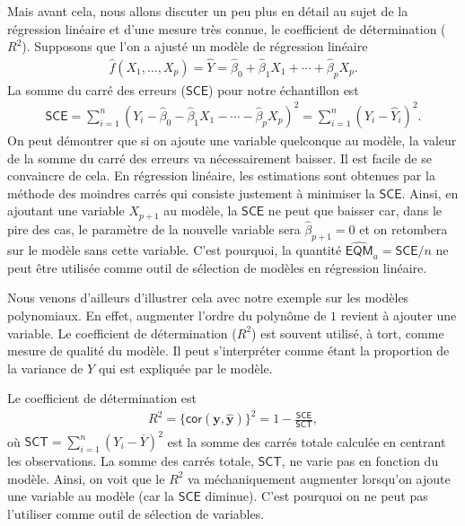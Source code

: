 \documentclass[
  11pt,
  letterpaper,
]{book}
\theoremstyle{definition}
\theoremstyle{remark}
\begin{document}
Mais avant cela, nous allons discuter un peu plus en détail au sujet de
la régression linéaire et d'une mesure très connue, le coefficient de
détermination (\(R^2\)). Supposons que l'on a ajusté un modèle de
régression linéaire \begin{align*}
\widehat{f}(X_1, \ldots, X_p) = \widehat{Y}=\widehat{\beta}_0 + \widehat{\beta}_1X_1+ \cdots + \widehat{\beta}_p X_p.
\end{align*} La somme du carré des erreurs (\(\mathsf{SCE}\)) pour notre
échantillon est \begin{align*}
\mathsf{SCE}=\sum_{i=1}^n (Y_i - \widehat{\beta}_0 - \widehat{\beta}_1X_1 - \cdots - \widehat{\beta}_p X_p)^2 = \sum_{i=1}^n (Y_i-\widehat{Y}_i)^2.
 \end{align*} On peut démontrer que si on ajoute une variable quelconque
au modèle, la valeur de la somme du carré des erreurs va nécessairement
baisser. Il est facile de se convaincre de cela. En régression linéaire,
les estimations sont obtenues par la méthode des moindres carrés qui
consiste justement à minimiser la \(\mathsf{SCE}\). Ainsi, en ajoutant
une variable \(X_{p+1}\) au modèle, la \(\mathsf{SCE}\) ne peut que
baisser car, dans le pire des cas, le paramètre de la nouvelle variable
sera \(\widehat{\beta}_{p+1}=0\) et on retombera sur le modèle sans
cette variable. C'est pourquoi, la quantité
\(\widehat{\mathsf{EQM}}_a=\mathsf{SCE}/n\) ne peut être utilisée comme
outil de sélection de modèles en régression linéaire.

Nous venons d'ailleurs d'illustrer cela avec notre exemple sur les
modèles polynomiaux. En effet, augmenter l'ordre du polynôme de \(1\)
revient à ajouter une variable. Le coefficient de détermination
(\(R^2\)) est souvent utilisé, à tort, comme mesure de qualité du
modèle. Il peut s'interpréter comme étant la proportion de la variance
de \(Y\) qui est expliquée par le modèle.

Le coefficient de détermination est \begin{align*}
R^2=\{\mathsf{cor}(\boldsymbol{y}, \widehat{\boldsymbol{y}})\}^2 = 1-\frac{\mathsf{SCE}}{\mathsf{SCT}},
\end{align*} où \(\mathsf{SCT}=\sum_{i=1}^n (Y_i-\overline{Y})^2\) est
la somme des carrés totale calculée en centrant les observations. La
somme des carrés totale, \(\mathsf{SCT}\), ne varie pas en fonction du
modèle. Ainsi, on voit que le \(R^2\) va méchaniquement augmenter
lorsqu'on ajoute une variable au modèle (car la \(\mathsf{SCE}\)
diminue). C'est pourquoi on ne peut pas l'utiliser comme outil de
sélection de variables.
\end{document}
